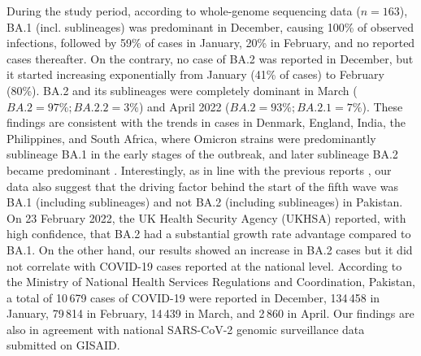 During the study period, according to whole-genome sequencing data ($n=163$), BA.1 (incl. sublineages) was predominant in December, causing 100\% of observed infections, followed by 59\% of cases in January, 20\% in February, and no reported cases thereafter.
On the contrary, no case of BA.2 was reported in December, but it started increasing exponentially from January (41\% of cases) to February (80\%).
BA.2 and its sublineages were completely dominant in March ($BA.2=97\%; BA.2.2=3\%$) and April 2022 ($BA.2=93\%; BA.2.1=7\%$).
These findings are consistent with the trends in cases in Denmark, England, India, the Philippines, and South Africa, where Omicron strains were predominantly sublineage BA.1 in the early stages of the outbreak, and later sublineage BA.2 became predominant \cite{hodcroft2021covariants}.
Interestingly, as in line with the previous reports \cite{mahase2022covid1, mahase2022covid2}, our data also suggest that the driving factor behind the start of the fifth wave was BA.1 (including sublineages) and not BA.2 (including sublineages) in Pakistan.
On 23 February 2022, the UK Health Security Agency (UKHSA) reported, with high confidence, that BA.2 had a substantial growth rate advantage compared to BA.1\cite{ukhsa-risk-assessment}.
On the other hand, our results showed an increase in BA.2 cases but it did not correlate with COVID-19 cases reported at the national level. 
According to the Ministry of National Health Services Regulations and Coordination, Pakistan, a total of 10\,679 cases of COVID-19 were reported in December, 134\,458 in January, 79\,814 in February, 14\,439 in March, and 2\,860 in April.
Our findings are also in agreement with national SARS-CoV-2 genomic surveillance data submitted on GISAID.

